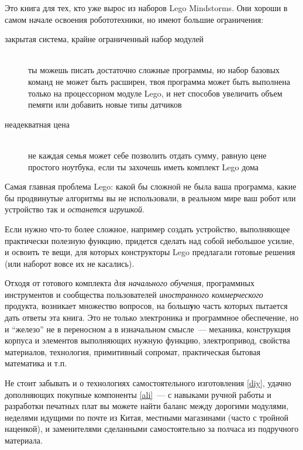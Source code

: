 \clearpage{}\secdown

\noindent
Это книга для тех, кто уже вырос из наборов Lego Mindstorms.
Они хороши в самом начале освоения робототехники, но имеют большие
ограничения:

\begin{description}

\item[закрытая система, крайне ограниченный набор модулей]\ \\ты можешь писать
достаточно сложные программы, но набор базовых команд не может быть расширен,
твоя программа может быть выполнена только на процессорном модуле Lego, и нет
способов увеличить объем пемяти или добавить новые типы датчиков

\item[неадекватная цена]\ \\не каждая семья может себе позволить отдать сумму,
равную цене простого ноутбука, если ты захочешь иметь комплект Lego дома

\end{description}
\clearpage

Самая главная проблема Lego: какой бы сложной не была ваша программа, какие бы
продвинутые алгоритмы вы не использовали, в реальном мире ваш робот или
устройство так и \textit{останется игрушкой}.


Если нужно что-то более сложное, например создать устройство, выполняющее
практически полезную функцию, придется сделать над собой небольшое усилие, и
освоить те вещи, для которых конструкторы Lego предлагали готовые решения (или
наборот вовсе их не касались).

Отходя от готового комплекта \textit{для начального обучения}, программных
инструментов и сообщества пользователей \textit{иностранного коммерческого}
продукта, возникает множество вопросов, на больш\textbf{у}ю часть которых
пытается дать ответы эта книга. Это не только электроника и программное
обеспечение, но и ``железо'' не в переносном а в изначальном смысле\ ---
механика, конструкция корпуса и элементов выполняющих нужную функцию,
электропривод, свойства материалов, технология, примитивный сопромат,
практическая бытовая математика и т.п.

Не стоит забывать и о технологиях самостоятельного изготовления \ref{diy},
удачно дополняющих покупные компоненты \ref{ali}\ --- с навыками ручной работы и
разработки печатных плат вы можете найти баланс между дорогими модулями,
неделями идущими по почте из Китая, местными магазинами (часто с тройной
наценкой), и заменителями сделанными самостоятельно за полчаса из подручного
материала.

\secup

